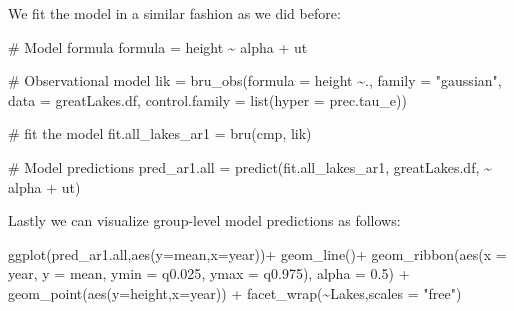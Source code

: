 \documentclass[
  letterpaper,
  DIV=11,
  numbers=noendperiod]{scrartcl}
\newenvironment{Shaded}{\begin{snugshade}}{\end{snugshade}}
\newcommand{\AttributeTok}[1]{\textcolor[rgb]{0.40,0.45,0.13}{#1}}
\newcommand{\CommentTok}[1]{\textcolor[rgb]{0.37,0.37,0.37}{#1}}
\newcommand{\FloatTok}[1]{\textcolor[rgb]{0.68,0.00,0.00}{#1}}
\newcommand{\FunctionTok}[1]{\textcolor[rgb]{0.28,0.35,0.67}{#1}}
\newcommand{\NormalTok}[1]{\textcolor[rgb]{0.00,0.23,0.31}{#1}}
\newcommand{\OtherTok}[1]{\textcolor[rgb]{0.00,0.23,0.31}{#1}}
\newcommand{\SpecialCharTok}[1]{\textcolor[rgb]{0.37,0.37,0.37}{#1}}
\newcommand{\StringTok}[1]{\textcolor[rgb]{0.13,0.47,0.30}{#1}}
\begin{document}
We fit the model in a similar fashion as we did before:

\begin{Shaded}
\begin{Highlighting}[]
\CommentTok{\# Model formula}
\NormalTok{formula }\OtherTok{=}\NormalTok{ height }\SpecialCharTok{\textasciitilde{}}\NormalTok{ alpha }\SpecialCharTok{+}\NormalTok{ ut}


\CommentTok{\# Observational model}
\NormalTok{lik }\OtherTok{=}  \FunctionTok{bru\_obs}\NormalTok{(}\AttributeTok{formula =}\NormalTok{ height  }\SpecialCharTok{\textasciitilde{}}\NormalTok{.,}
            \AttributeTok{family =} \StringTok{"gaussian"}\NormalTok{,}
            \AttributeTok{data =}\NormalTok{ greatLakes.df,}
            \AttributeTok{control.family =} \FunctionTok{list}\NormalTok{(}\AttributeTok{hyper =}\NormalTok{ prec.tau\_e))}

\CommentTok{\# fit the model}
\NormalTok{fit.all\_lakes\_ar1 }\OtherTok{=} \FunctionTok{bru}\NormalTok{(cmp, lik)}

\CommentTok{\# Model predictions}
\NormalTok{pred\_ar1.all }\OtherTok{=} \FunctionTok{predict}\NormalTok{(fit.all\_lakes\_ar1, greatLakes.df, }\SpecialCharTok{\textasciitilde{}}\NormalTok{ alpha }\SpecialCharTok{+}\NormalTok{ ut)}
\end{Highlighting}
\end{Shaded}

Lastly we can visualize group-level model predictions as follows:

\begin{Shaded}
\begin{Highlighting}[]
\FunctionTok{ggplot}\NormalTok{(pred\_ar1.all,}\FunctionTok{aes}\NormalTok{(}\AttributeTok{y=}\NormalTok{mean,}\AttributeTok{x=}\NormalTok{year))}\SpecialCharTok{+}
  \FunctionTok{geom\_line}\NormalTok{()}\SpecialCharTok{+}
    \FunctionTok{geom\_ribbon}\NormalTok{(}\FunctionTok{aes}\NormalTok{(}\AttributeTok{x =}\NormalTok{ year, }\AttributeTok{y =}\NormalTok{ mean, }\AttributeTok{ymin =}\NormalTok{ q0}\FloatTok{.025}\NormalTok{, }\AttributeTok{ymax =}\NormalTok{ q0}\FloatTok{.975}\NormalTok{),}
                \AttributeTok{alpha =} \FloatTok{0.5}\NormalTok{) }\SpecialCharTok{+}
  \FunctionTok{geom\_point}\NormalTok{(}\FunctionTok{aes}\NormalTok{(}\AttributeTok{y=}\NormalTok{height,}\AttributeTok{x=}\NormalTok{year)) }\SpecialCharTok{+} \FunctionTok{facet\_wrap}\NormalTok{(}\SpecialCharTok{\textasciitilde{}}\NormalTok{Lakes,}\AttributeTok{scales =} \StringTok{"free"}\NormalTok{)}
\end{Highlighting}
\end{Shaded}
\end{document}
